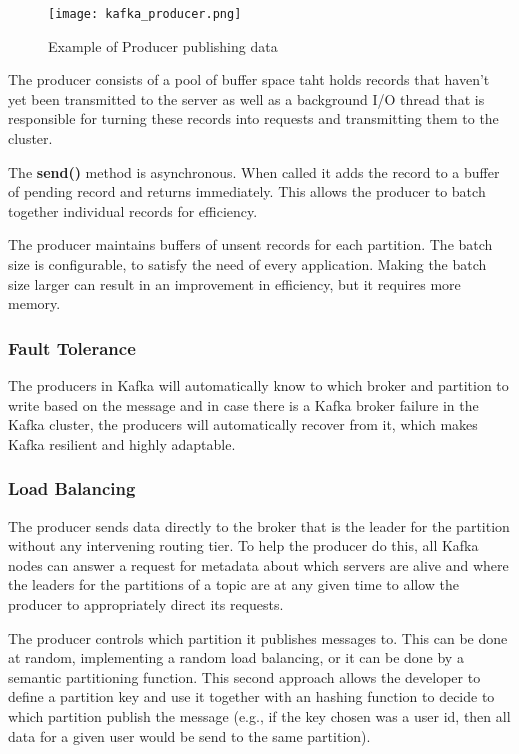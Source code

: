 \begin{figure}[ht]
    \centering
    \texttt{[image: kafka\_producer.png]}
    \caption{Example of Producer publishing data}
\end{figure}

The producer consists of a pool of buffer space taht holds records that haven't
yet been transmitted to the server as well as a background I/O thread that is
responsible for turning these records into requests and transmitting them to
the cluster.

The \textbf{send()} method is asynchronous. When called it adds the record to a
buffer of pending record and returns immediately. This allows the producer to
batch together individual records for efficiency.

The producer maintains buffers of unsent records for each partition. The batch
size is configurable, to satisfy the need of every application. Making the
batch size larger can result in an improvement in efficiency, but it requires
more memory.

\subsubsection{Fault Tolerance}

The producers in Kafka will automatically know to which broker and partition to
write based on the message and in case there is a Kafka broker failure in the
Kafka cluster, the producers will automatically recover from it, which makes
Kafka resilient and highly adaptable.

\subsubsection{Load Balancing}

The producer sends data directly to the broker that is the leader for the
partition without any intervening routing tier. To help the producer do this,
all Kafka nodes can answer a request for metadata about which servers are alive
and where the leaders for the partitions of a topic are at any given time to
allow the producer to appropriately direct its requests.

The producer controls which partition it publishes messages to. This can be
done at random, implementing a random load balancing, or it can be done by a
semantic partitioning function.
This second approach allows the developer to define a partition key and use it
together with an hashing function to decide to which partition publish the
message (e.g., if the key chosen was a user id, then all data for a given user
would be send to the same partition).

